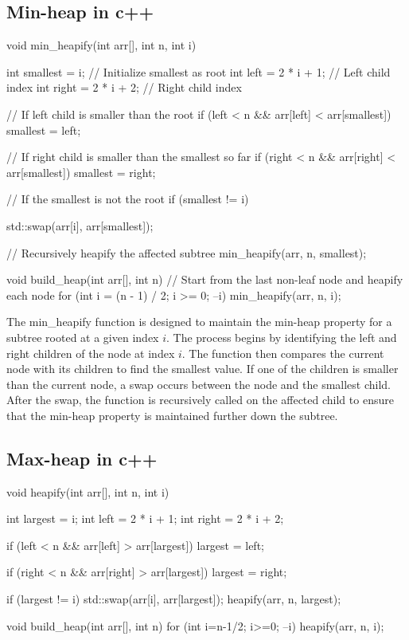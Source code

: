 \documentclass{report}
\begin{document}
\subsection{Min-heap in c++}
\bigbreak \noindent 
\begin{cppcode}
void min_heapify(int arr[], int n, int i) {
    int smallest = i;    // Initialize smallest as root
    int left = 2 * i + 1;   // Left child index
    int right = 2 * i + 2;  // Right child index

    // If left child is smaller than the root
    if (left < n && arr[left] < arr[smallest])
        smallest = left;

    // If right child is smaller than the smallest so far
    if (right < n && arr[right] < arr[smallest])
        smallest = right;

    // If the smallest is not the root
    if (smallest != i) {
        std::swap(arr[i], arr[smallest]);

        // Recursively heapify the affected subtree
        min_heapify(arr, n, smallest);
    }
}

void build_heap(int arr[], int n) {
    // Start from the last non-leaf node and heapify each node
    for (int i = (n - 1) / 2; i >= 0; --i) {
        min_heapify(arr, n, i);
    }
}
\end{cppcode}
\bigbreak \noindent 
The min\_heapify function is designed to maintain the min-heap property for a subtree rooted at a given index $i$. The process begins by identifying the left and right children of the node at index $i$. The function then compares the current node with its children to find the smallest value. If one of the children is smaller than the current node, a swap occurs between the node and the smallest child. After the swap, the function is recursively called on the affected child to ensure that the min-heap property is maintained further down the subtree.

\pagebreak 
\subsection{Max-heap in c++}
\bigbreak \noindent 
\begin{cppcode}
    void heapify(int arr[], int n, int i) {
        int largest = i;
        int left = 2 * i + 1;
        int right = 2 * i + 2;

        if (left < n && arr[left] > arr[largest]) {
            largest = left;
        }

        if (right < n && arr[right] > arr[largest]) {
            largest = right;
        }

        if (largest != i) {
            std::swap(arr[i], arr[largest]);
            heapify(arr, n, largest);
        }
    }


    void build_heap(int arr[], int n) {
        for (int i=n-1/2; i>=0; --i) {
            heapify(arr, n, i);
        }
    }
\end{cppcode}
\end{document}
